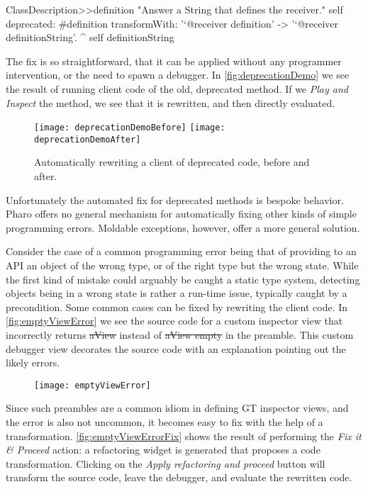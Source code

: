 \documentclass[sigplan,anonymous,review,10pt]{acmart}
\begin{document}
\begin{code}
ClassDescription>>definition
	"Answer a String that defines the receiver."
	self
		deprecated: #definition
		transformWith: '`@receiver definition' -> '`@receiver definitionString'.
	^ self definitionString
\end{code}

The fix is so straightforward, that it can be applied without any programmer intervention, or the need to spawn a debugger.
In \autoref{fig:deprecationDemo} we see the result of running client code of the old, deprecated method.
If we \emph{Play and Inspect} the method, we see that it is rewritten, and then directly evaluated.

\begin{figure}[h]
  \texttt{[image: deprecationDemoBefore]}
  \texttt{[image: deprecationDemoAfter]}
  \caption{Automatically rewriting a client of deprecated code, before and after.}
  \label{fig:deprecationDemo}
\end{figure}

Unfortunately the automated fix for deprecated methods is bespoke behavior.
Pharo offers no general mechanism for automatically fixing other kinds of simple programming errors.
Moldable exceptions, however, offer a more general solution.

Consider the case of a common programming error being that of providing to an API an object of the wrong type, or of the right type but the wrong state.
While the first kind of mistake could arguably be caught a static type system, detecting objects being in a wrong state is rather a run-time issue, typically caught by a precondition.
Some common cases can be fixed by rewriting the client code.
In \autoref{fig:emptyViewError} we see the source code for a custom inspector view that incorrectly returns \st{aView} instead of \st{aView empty} in the preamble.
This custom debugger view decorates the source code with an explanation pointing out the likely errors.

\begin{figure}[h]
  \texttt{[image: emptyViewError]}
  \caption{}
  \label{fig:emptyViewError}
\end{figure}

Since such preambles are a common idiom in defining GT inspector views, and the error is also not uncommon, it becomes easy to fix with the help of a transformation.
\autoref{fig:emptyViewErrorFix} shows the result of performing the \emph{Fix it \& Proceed} action: a refactoring widget is generated that proposes a code transformation.
Clicking on the \emph{Apply refactoring and proceed} button will transform the source code, leave the debugger, and evaluate the rewritten code.
\end{document}
